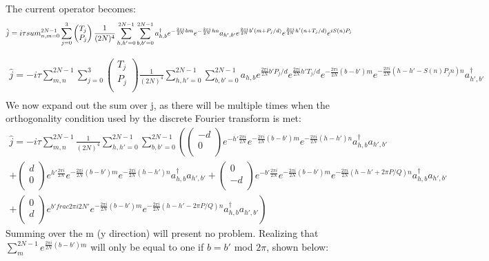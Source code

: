 \documentclass[12pt]{article}
\begin{document}
The current operator becomes:
\begin{multline}
\hat{j} =\-i\tau sum^{2N-1}_{n,m=0} \sum_{j=0}^3
		   \begin{pmatrix}
			T_j \\
			P_j\\
		\end{pmatrix}
\frac{1}{(2N)^4} \sum^{2N-1}_{h,h'=0} \sum^{2N-1}_{b,b'=0}  a^\dagger_{h,b} e^{-\frac{2 \pi i}{2N}bm}  e^{-\frac{2 \pi i}{2N}hn} a_{h',b'} e^{\frac{2 \pi i}{2N}b'(m+P_j/d)}  e^{\frac{2 \pi i}{2N}h'(n+T_j/d)} e^{i S(n) P_j} 
\end{multline}

\begin{multline}
\hat{j} =  -i\tau \sum^{2N-1}_{m,n} \sum_{j=0}^3 \begin{pmatrix}
			T_j \\
			P_j\\
		\end{pmatrix}  
\frac{1}{(2N)^4} \sum^{2N-1}_{h,h'=0} \sum^{2N-1}_{b,b'=0}  a_{h,b} e^{ \frac{2 \pi i}{2N} b'P_j/d}e^{\frac{2 \pi i}{2N} h'T_j/d} e^{-\frac{2 \pi i}{2N}(b-b')m}  e^{-\frac{2 \pi i}{2N}(h-h'-S(n)P_j{n})n} a^\dagger_{h',b'}  \\
\end{multline}
We now expand out the sum over j, as there will be multiple times when
the orthogonality condition used by the discrete Fourier transform is met:
\begin{multline}
\hat{j} =  -i\tau \sum^{2N-1}_{m,n} 
\frac{1}{(2N)^4} \sum^{2N-1}_{h,h'=0} \sum^{2N-1}_{b,b'=0} \left( \begin{pmatrix}
			-d \\
			0\\
		\end{pmatrix}  e^{-h'\frac{2 \pi i}{2N}}  e^{-\frac{2 \pi i}{2N}(b-b')m}  e^{-\frac{2 \pi i}{2N}(h-h')n}a^\dagger_{h,b} a_{h',b'}\right.\\
		+  \begin{pmatrix}
			d \\
		0\\
		\end{pmatrix}  e^{h'\frac{2 \pi i}{2N}}  e^{-\frac{2 \pi i}{2N}(b-b')m}  e^{-\frac{2 \pi i}{2N}(h-h')n} a^\dagger_{h,b}a_{h',b'}
		+  \begin{pmatrix}
			0 \\
		-d\\
		\end{pmatrix}  e^{-b'\frac{2 \pi i}{2N} }  e^{-\frac{2 \pi i}{2N}(b-b')m}  e^{-\frac{2 \pi i}{2N}(h-h'+2 \pi P/Q)n} a^\dagger_{h,b}a_{h',b'}\\
		\left.+ \begin{pmatrix}
			0 \\
		d\\
		\end{pmatrix}   e^{b'frac{2 \pi i}{2N}'} e^{-\frac{2 \pi i}{2N}(b-b')m}  e^{-\frac{2 \pi i}{2N}(h-h'-2\pi P/Q)n} a^\dagger_{h,b}a_{h',b'} \right) 
\end{multline}
Summing over the m (y direction) will present no problem. Realizing that
$\sum_m^{2N-1} e^{\frac{2 \pi i}{2N}(b-b')m}$ will only be equal to one if $b=b'$ mod $2 \pi$, shown below:
\end{document}
